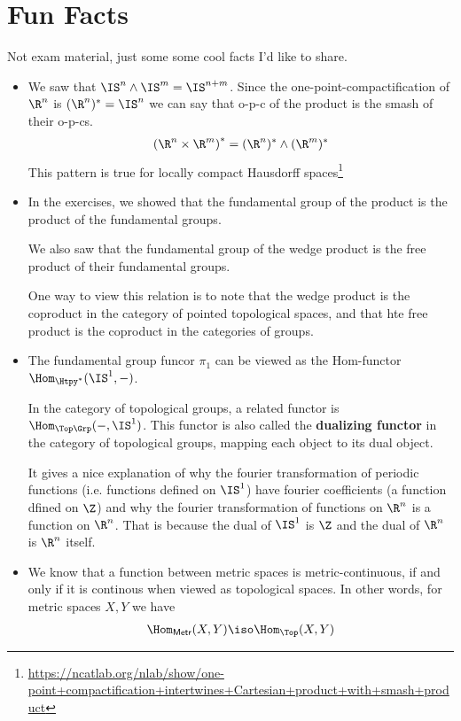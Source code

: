 \section{Fun Facts}
Not exam material, just some some cool facts I'd like to share.

\begin{itemize}
  \item We saw that $\IS^{n} \wedge \IS^{m} = \IS^{n+m}$. Since the one-point-compactification of $\R^{n}$ is $(\R^{n})^{\ast} = \IS^{n}$ we can say that o-p-c of the product is the smash of their o-p-cs.
    \begin{align*}
      \left(
        \R^{n} \times \R^{m}
      \right)^{\ast}
      =
      (\R^{n})^{\ast} \wedge (\R^{m})^{\ast}
    \end{align*}
    This pattern is true for locally compact Hausdorff spaces\footnote{\url{https://ncatlab.org/nlab/show/one-point+compactification+intertwines+Cartesian+product+with+smash+product}}
    
  \item In the exercises, we showed that the fundamental group of the product is the product of the fundamental groups.

    We also saw that the fundamental group of the wedge product is the free product of their fundamental groups.

    One way to view this relation is to note that the wedge product is the coproduct in the category of pointed topological spaces, and that hte free product is the coproduct in the categories of groups.

  \item The fundamental group funcor $\pi_1$ can be viewed as the Hom-functor $\Hom_{\Htpy^{\ast}}(\IS^{1},-)$.

    In the category of topological groups, a related functor is $\Hom_{\Top\Grp}(-,\IS^{1})$.
    This functor is also called the \textbf{dualizing functor} in the category of topological groups, mapping each object to its dual object.

    It gives a nice explanation of why the fourier transformation of periodic functions (i.e. functions defined on $\IS^{1}$) have fourier coefficients (a function dfined on $\Z$) and why the fourier transformation of functions on $\R^{n}$ is a function on $\R^{n}$.
    That is because the dual of $\IS^{1}$ is $\Z$ and the dual of $\R^{n}$ is $\R^{n}$ itself.


  \item We know that a function between metric spaces is metric-continuous, if and only if it is continous when viewed as topological spaces.
    In other words, for metric spaces $X,Y$ we have
    \begin{align*}
      \Hom_{\textsf{Metr}}(X,Y) \iso \Hom_{\Top}(X,Y)
    \end{align*}


\end{itemize}
